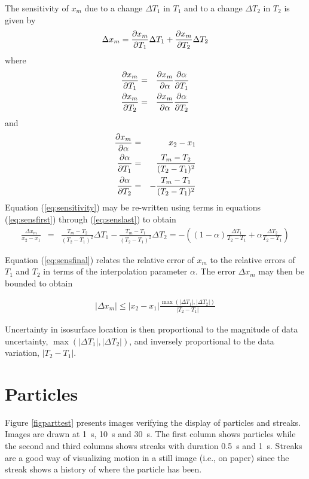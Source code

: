\documentclass[11pt,twoside]{book}
\begin{document}
\noindent The sensitivity of $x_m$ due to a change $\Delta T_1$ in $T_1$ and to a
change $\Delta T_2$ in $T_2$ is given by
\begin{eqnarray}
\Delta x_m= \frac{\partial x_m}{\partial T_1} \Delta T_1 + \frac{\partial x_m}{\partial T_2} \Delta T_2
\label{eq:sensitivity}
\end{eqnarray}
where
\begin{eqnarray}
\frac{\partial x_m}{\partial T_1}&=&\frac{\partial x_m}{\partial \alpha}\frac{\partial \alpha}{\partial T_1} \label{eq:sensfirst}\\
\frac{\partial x_m}{\partial T_2}&=&\frac{\partial x_m}{\partial \alpha}\frac{\partial \alpha}{\partial T_2}
\end{eqnarray}
and
\begin{eqnarray}
\frac{\partial x_m}{\partial \alpha}&=&x_2-x_1\\
\frac{\partial \alpha}{\partial T_1}&=&\frac{T_m-T_2}{(T_2-T_1)^2}\\
\frac{\partial \alpha}{\partial T_2}&=&-\frac{T_m-T_1}{(T_2-T_1)^2}
\label{eq:senslast}
\end{eqnarray}
Equation (\ref{eq:sensitivity}) may be re-written using terms in equations
(\ref{eq:sensfirst}) through (\ref{eq:senslast}) to obtain
\begin{eqnarray}
\frac{\Delta x_m}{x_2-x_1}&=&\frac{T_m-T_2}{(T_2-T_1)^2}\Delta T_1-
\frac{T_m-T_1}{(T_2-T_1)^2}\Delta T_2
=-\left(
(1-\alpha)\frac{\Delta T_1}{T_2-T_1}+
\alpha\frac{\Delta T_2}{T_2-T_1}\right)
\label{eq:sensfinal}
\end{eqnarray}

\noindent Equation (\ref{eq:sensfinal}) relates the relative error of $x_m$ to
the relative errors of $T_1$ and $T_2$ in terms of the interpolation parameter $\alpha$.
The error $\Delta x_m$ may then be bounded to obtain

\begin{eqnarray}
|\Delta x_m|\le
|x_2-x_1|\frac{\max(|\Delta T_1|,|\Delta T_2|)}{|T_2-T_1|}
\end{eqnarray}

\noindent Uncertainty in isosurface location is then proportional to the magnitude
of data uncertainty, $\max(|\Delta T_1|,|\Delta T_2|)$, and inversely proportional
to the data variation, $|T_2-T_1|$.


\clearpage

\section{Particles}

Figure \ref{figparttest} presents images verifying the display of particles and streaks.
Images are drawn at \SI{1}{s}, \SI{10}{s} and \SI{30}{s}. The first column shows particles
while the second and third columns shows streaks with duration \SI{0.5}{s} and \SI{1}{s}.
Streaks are a good way of visualizing motion in a still image (i.e., on paper) since the
streak shows a history of where the particle has been.
\end{document}
